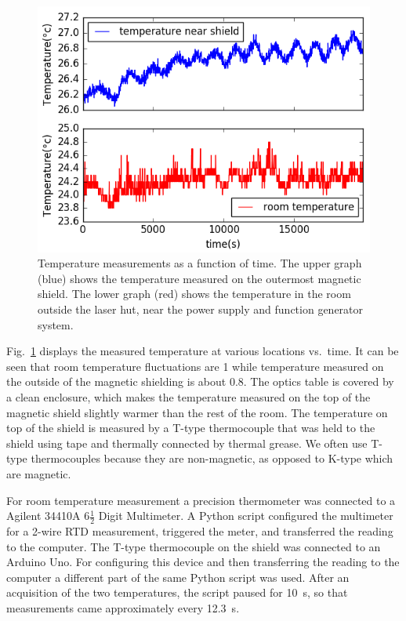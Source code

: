 \begin{figure}%
\centering\includegraphics[width=0.8\linewidth]{figures/temp_.png}
\caption{Temperature measurements as a function of time.  The upper
  graph (blue) shows the temperature measured on the outermost
  magnetic shield.  The lower graph (red) shows the temperature in the
  room outside the laser hut, near the power supply and function
  generator system.\label{fig:temperature-measurement}}
\end{figure}

Fig.~\ref{fig:temperature-measurement} displays the measured
temperature at various locations vs.~time.  It can be seen that room
temperature fluctuations are 1 while temperature measured on
the outside of the magnetic shielding is about 0.8.  The
optics table is covered by a clean enclosure, which makes the
temperature measured on the top of the magnetic shield slightly warmer
than the rest of the room.  The temperature on top of the shield is
measured by a T-type thermocouple that was held to the shield using
tape and thermally connected by thermal grease.  We often use T-type
thermocouples because they are non-magnetic, as opposed to K-type
which are magnetic.

For room temperature measurement a precision thermometer was connected
to a Agilent 34410A 6$\frac{1}{2}$ Digit Multimeter.  A Python script
configured the multimeter for a 2-wire RTD measurement, triggered the
meter, and transferred the reading to the computer.  The T-type
thermocouple on the shield was connected to an Arduino Uno.  For
configuring this device and then transferring the reading to the
computer a different part of the same Python script was used.  After
an acquisition of the two temperatures, the script paused for 10~s, so
that measurements came approximately every 12.3~s.

